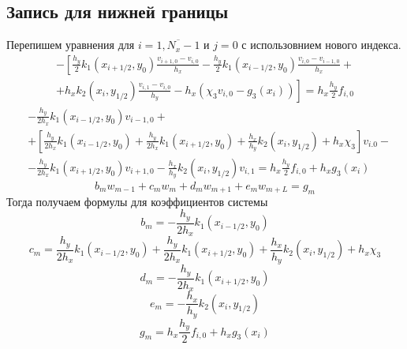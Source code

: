 \subsection{Запись для нижней границы}
Перепишем уравнения для $i = \overline{1,N_x-1}$ и $j = 0$ с использовнием нового индекса.
\begin{multline*}
    - \left[
    \frac{h_y}{2} k_1(x_{i+1/2},y_0) \frac{v_{i+1,0} - v_{i,0}}{h_x} - \frac{h_y}{2} k_1(x_{i-1/2},y_0) \frac{v_{i,0} - v_{i-1,0}}{h_x} + \right. \\
    \left. +
    h_x k_2(x_i,y_{1/2}) \frac{v_{i,1} - v_{i,0}}{h_y} - h_x \left( \chi_3 v_{i,0} - g_3(x_i) \right)
    \right] =
    h_x \frac{h_y}{2} f_{i,0}
\end{multline*}
\[
\begin{split}
    &-\frac{h_y}{2 h_x} k_1(x_{i-1/2},y_0) v_{i-1,0} +\\
    &+\left[ \frac{h_y}{2 h_x} k_1(x_{i-1/2},y_0) + \frac{h_y}{2 h_x} k_1(x_{i+1/2},y_0) + \frac{h_x}{h_y} k_2(x_i,y_{1/2}) + h_x \chi_3 \right] v_{i.0} - \\
    &- \frac{h_y}{2 h_x} k_1(x_{i+1/2},y_0) v_{i+1,0} - \frac{h_x}{h_y} k_2(x_i,y_{1/2}) v_{i,1} = h_x \frac{h_y}{2} f_{i,0} + h_x g_3(x_i)
\end{split}
\]
\[ b_m w_{m - 1} + c_m w_m + d_m w_{m + 1} + e_m w_{m + L} = g_m \]
Тогда получаем формулы для коэффициентов системы
\[ b_m = -\frac{h_y}{2 h_x} k_1(x_{i-1/2},y_0) \]
\[ c_m = \frac{h_y}{2 h_x} k_1(x_{i-1/2},y_0) + \frac{h_y}{2 h_x} k_1(x_{i+1/2},y_0) + \frac{h_x}{h_y} k_2(x_i,y_{1/2}) + h_x \chi_3 \]
\[ d_m = -\frac{h_y}{2 h_x} k_1(x_{i+1/2},y_0) \]
\[ e_m = -\frac{h_x}{h_y} k_2(x_i,y_{1/2}) \]
\[ g_m = h_x \frac{h_y}{2} f_{i,0} + h_x g_3(x_i) \]

